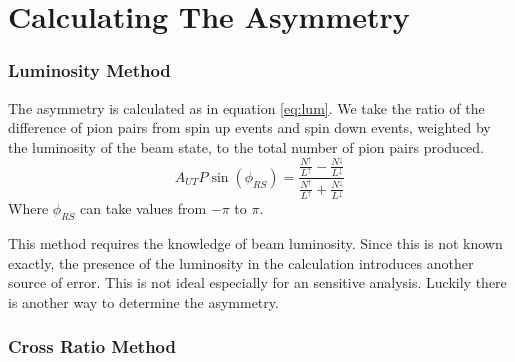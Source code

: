 \documentclass[abstract = on,listof=totoc, bibliography=totoc]{scrreprt}
\begin{document}
\FloatBarrier
\section{Calculating The Asymmetry}




\subsubsection{Luminosity Method}

The asymmetry is calculated as in equation \ref{eq:lum}. We take the ratio of the difference of pion pairs from spin up events and spin down events, weighted by the luminosity of the beam state, to the total number of pion pairs produced.
\begin{equation}
A_{UT}P\sin\left(\phi_{RS}\right) = \frac{\frac{N^\uparrow}{L^\uparrow} - \frac{N^\downarrow}{L^\downarrow}} {\frac{N^\uparrow}{L^\uparrow} + \frac{N^\downarrow}{L^\downarrow}}
\label{eq:lum}
\end{equation}
Where $\phi_{RS}$ can take values from $-\pi$ to $\pi$.

This method requires the knowledge of beam luminosity. Since this is not known exactly, the presence of the luminosity in the calculation introduces another source of error. This is not ideal especially for an sensitive analysis. Luckily there is another way to determine the asymmetry.   

\subsubsection{Cross Ratio Method}
\end{document}
